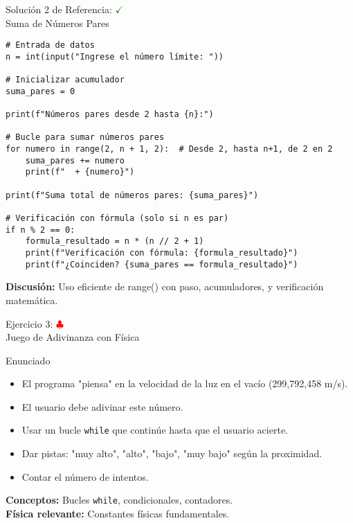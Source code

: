\documentclass[10pt]{beamer}
\begin{document}
\begin{frame}[fragile]{Solución 2 de Referencia: \hfill \textcolor{green}{$\checkmark$} \\ Suma de Números Pares}
\begin{verbatim}
# Entrada de datos
n = int(input("Ingrese el número límite: "))

# Inicializar acumulador
suma_pares = 0

print(f"Números pares desde 2 hasta {n}:")

# Bucle para sumar números pares
for numero in range(2, n + 1, 2):  # Desde 2, hasta n+1, de 2 en 2
    suma_pares += numero
    print(f"  + {numero}")

print(f"Suma total de números pares: {suma_pares}")

# Verificación con fórmula (solo si n es par)
if n % 2 == 0:
    formula_resultado = n * (n // 2 + 1)
    print(f"Verificación con fórmula: {formula_resultado}")
    print(f"¿Coinciden? {suma_pares == formula_resultado}")
\end{verbatim}
\textbf{Discusión:} Uso eficiente de range() con paso, acumuladores, y verificación matemática.
\end{frame}

\begin{frame}{Ejercicio 3: \hfill \textcolor{red}{$\clubsuit$} \\ Juego de Adivinanza con Física}
  \begin{block}{Enunciado}
    \begin{itemize}
      \item El programa "piensa" en la velocidad de la luz en el vacío (299,792,458 m/s).
      \item El usuario debe adivinar este número.
      \item Usar un bucle \texttt{while} que continúe hasta que el usuario acierte.
      \item Dar pistas: "muy alto", "alto", "bajo", "muy bajo" según la proximidad.
      \item Contar el número de intentos.
    \end{itemize}
  \end{block}
  
  \textbf{Conceptos:} Bucles \texttt{while}, condicionales, contadores.
  \\
  \textbf{Física relevante:} Constantes físicas fundamentales.
\end{frame}
\end{document}
